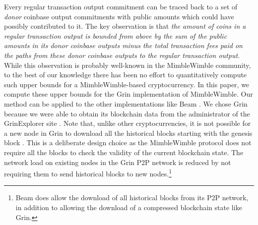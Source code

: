 Every regular transaction output commitment can be traced back to a set of \textit{donor} coinbase output commitments with public amounts which could have possibly contributed to it. The key observation is that \textit{the amount of coins in a regular transaction output is bounded from above by the sum of the public amounts in its donor coinbase outputs minus the total transaction fees paid on the paths from these donor coinbase outputs to the regular transaction output}. While this observation is probably well-known in the MimbleWimble community, to the best of our knowledge there has been no effort to quantitatively compute such upper bounds for a MimbleWimble-based cryptocurrency. In this paper, we compute these upper bounds for the Grin implementation \cite{GrinWebsite} of MimbleWimble. Our method can be applied to the other implementations like Beam \cite{BeamWebsite}. We chose Grin because we were able to obtain its blockchain data from the administrator of the GrinExplorer site \cite{GrinExplorerWebsite}. Note that, unlike other cryptocurrencies, it is not possible for a new node in Grin to download all the historical blocks starting with the genesis block \cite{GrinForumReply}. This is a deliberate design choice as the MimbleWimble protocol does not require all the blocks to check the validity of the current blockchain state.
The network load on existing nodes in the Grin P2P network is reduced by not requiring them to send historical blocks to new nodes.\footnote{Beam does allow the download of all historical blocks from its P2P network, in addition to allowing the download of a compressed blockchain state like Grin.}


